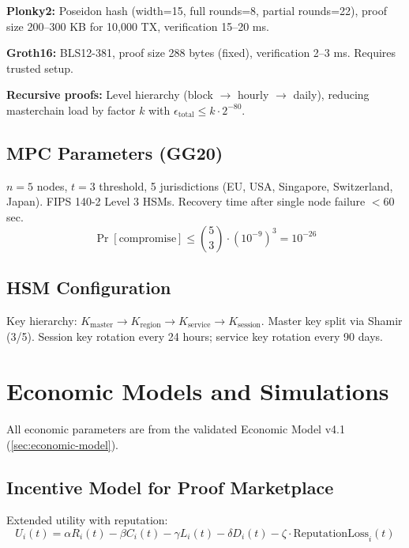 \documentclass[12pt,a4paper]{article}
\theoremstyle{definition}
\theoremstyle{remark}
\begin{document}
\textbf{Plonky2:} Poseidon hash (width=15, full rounds=8, partial rounds=22), proof size 200--300 KB for 10,000 TX, verification 15--20 ms.

\textbf{Groth16:} BLS12-381, proof size 288 bytes (fixed), verification 2--3 ms. Requires trusted setup.

\textbf{Recursive proofs:} Level hierarchy (block $\to$ hourly $\to$ daily), reducing masterchain load by factor $k$ with $\epsilon_{\text{total}} \leq k \cdot 2^{-80}$.

\subsection{MPC Parameters (GG20)}

$n = 5$ nodes, $t = 3$ threshold, 5 jurisdictions (EU, USA, Singapore, Switzerland, Japan). FIPS 140-2 Level 3 HSMs. Recovery time after single node failure $< 60$ sec.
\begin{equation}
\Pr[\text{compromise}] \leq \binom{5}{3} \cdot (10^{-9})^3 = 10^{-26}
\end{equation}

\subsection{HSM Configuration}

Key hierarchy: $K_{\text{master}} \to K_{\text{region}} \to K_{\text{service}} \to K_{\text{session}}$. Master key split via Shamir (3/5). Session key rotation every 24 hours; service key rotation every 90 days.


\section{Economic Models and Simulations}
\label{app:economics}

All economic parameters are from the validated Economic Model v4.1 (\cref{sec:economic-model}).

\subsection{Incentive Model for Proof Marketplace}

Extended utility with reputation:
\begin{equation}
U_i(t) = \alpha R_i(t) - \beta C_i(t) - \gamma L_i(t) - \delta D_i(t) - \zeta \cdot \text{ReputationLoss}_i(t)
\end{equation}
\end{document}
